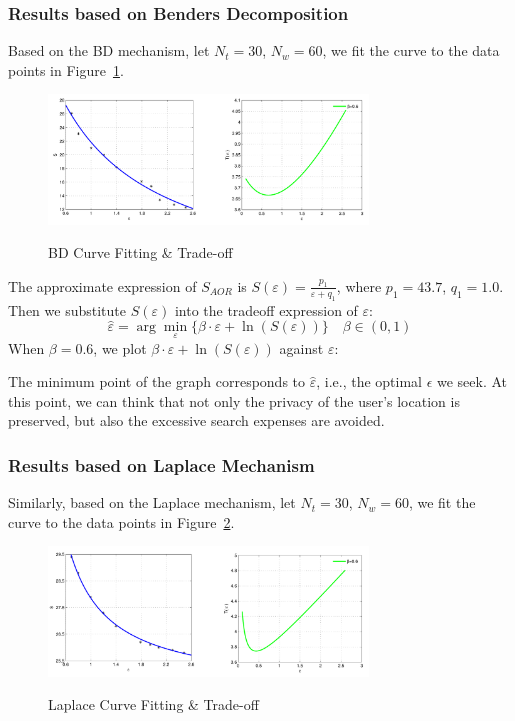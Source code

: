 \subsubsection{Results based on Benders Decomposition}
Based on the BD mechanism, let $N_t=30$, $N_w=60$, we fit the curve to the data points in Figure~\ref{img:CurveBD}.

\begin{figure}
\includegraphics[width=8.5cm]{CurveBD}
\label{img:CurveBD}
\caption{BD Curve Fitting \& Trade-off}
\end{figure}

The approximate expression of $S_{AOR}$ is $S(\varepsilon)=\frac{p_1}{\varepsilon + q_1}$, where $p_1=43.7$, $q_1=1.0$. Then we substitute $S(\varepsilon)$ into the tradeoff expression of $\varepsilon$:
$$
	\hat{\varepsilon}=\arg \min_\varepsilon \{ \beta \cdot \varepsilon + \ln (S(\varepsilon)) \} \quad \beta \in (0,1)
$$
When $\beta=0.6$, we plot $\beta \cdot \varepsilon + \ln (S(\varepsilon))$ against $\varepsilon$:

The minimum point of the graph corresponds to $\hat{\varepsilon}$, i.e., the optimal $\epsilon$ we seek. At this point, we can think that not only the privacy of the user's location is preserved, but also the excessive search expenses are avoided. 

\subsubsection{Results based on Laplace Mechanism}
Similarly, based on the Laplace mechanism, let $N_t=30$, $N_w=60$, we fit the curve to the data points in Figure~\ref{img:CurveLP}.

\begin{figure}
\includegraphics[width=8.5cm]{CurveLP}
\label{img:CurveLP}
\caption{Laplace Curve Fitting \& Trade-off}
\end{figure}

